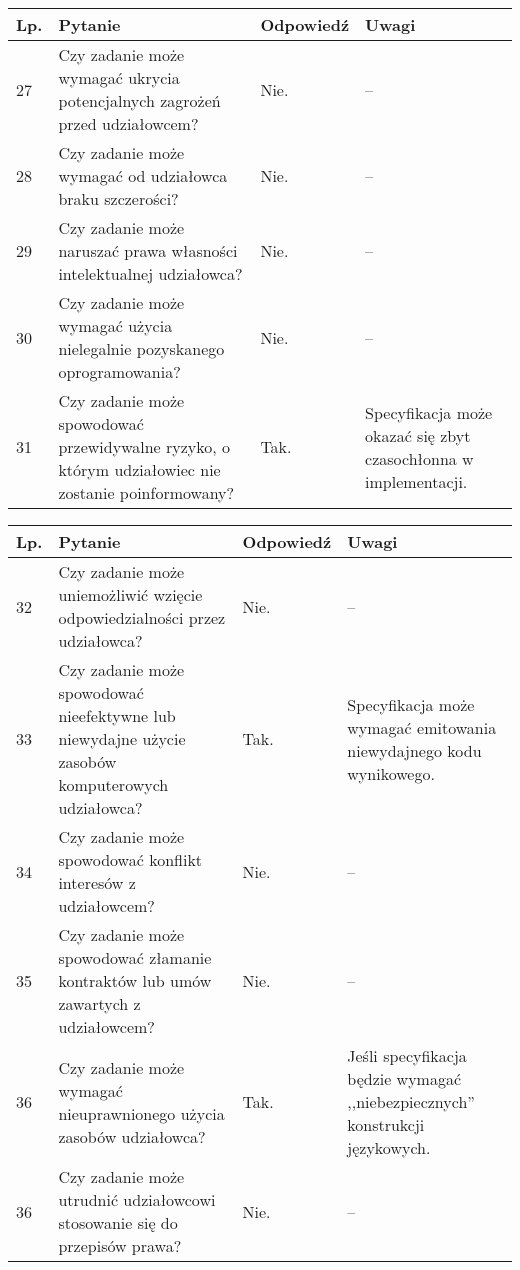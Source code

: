\documentclass[11pt,oneside,a4paper,titlepage,onecolumn]{article}
\begin{document}
\begin{tabularx}{\textwidth}{|l|X|l|X|}
    \hline
    Lp. & Pytanie & Odpowiedź & Uwagi \\ \hline

	27
	& Czy zadanie może wymagać ukrycia potencjalnych zagrożeń przed udziałowcem?
	& Nie.
	& --
	\\\hline

	28
	& Czy zadanie może wymagać od udziałowca braku szczerości?
	& Nie.
	& --
	\\\hline

	29
	& Czy zadanie może naruszać prawa własności intelektualnej udziałowca?
	& Nie.
	& --
	\\\hline

	30
	& Czy zadanie może wymagać użycia nielegalnie pozyskanego oprogramowania?
	& Nie.
	& --
	\\\hline

	31
	& Czy zadanie może spowodować przewidywalne ryzyko, o którym udziałowiec nie
    zostanie poinformowany?
	& Tak.
	& Specyfikacja może okazać się zbyt czasochłonna w implementacji.
	\\\hline
\end{tabularx}
	
\begin{tabularx}{\textwidth}{|l|X|l|X|}
    \hline
    Lp. & Pytanie & Odpowiedź & Uwagi \\ \hline
    
	32
	& Czy zadanie może uniemożliwić wzięcie odpowiedzialności przez udziałowca?
	& Nie.
	& --
	\\\hline

	33
	& Czy zadanie może spowodować nieefektywne lub niewydajne użycie zasobów
    komputerowych udziałowca?
	& Tak.
	& Specyfikacja może wymagać emitowania niewydajnego kodu wynikowego.
	\\\hline

	34
	& Czy zadanie może spowodować konflikt interesów z udziałowcem?
	& Nie.
	& --
	\\\hline

	35
	& Czy zadanie może spowodować złamanie kontraktów lub umów zawartych z
    udziałowcem?
	& Nie.
	& --
	\\\hline

	36
	& Czy zadanie może wymagać nieuprawnionego użycia zasobów udziałowca?
	& Tak.
	& Jeśli specyfikacja będzie wymagać ,,niebezpiecznych'' konstrukcji
    językowych.
	\\\hline

	36
	& Czy zadanie może utrudnić udziałowcowi stosowanie się do przepisów prawa?
	& Nie.
	& --
	\\\hline
\end{tabularx}
\end{document}
